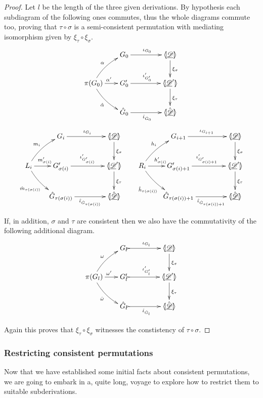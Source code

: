 \begin{proof} Let $l$ be the length of the three given derivations.  By hypothesis each subdiagram of the following ones commutes, thus the whole diagrams commute too, proving that $\tau\circ \sigma$ is a semi-consistent permutation with mediating isomorphism given by $\xi_{\tau} \circ \xi_\sigma$.
		\[\xymatrix@C=18pt{ & G_0 \ar[rr]^{\iota_{G_0}} &&\tpro{D} \ar[d]^{\xi_\sigma} \\ \pi(G_0) \ar@/_.2cm/[dr]_{\hat{\alpha}}\ar@/^.2cm/[ur]^{\alpha} \ar[r]^{\alpha'} &G'_0 \ar[rr]^{\iota'_{G'_0}}  &&\lpro \der{D}'  \rpro \ar[d]^{\xi_{\tau}}\\ &\hat{G}_0  \ar[rr]_{\hat{\iota}_{\hat{G}_0}}&& \lpro \hat{\der{D}}\rpro }\]  
		\[\xymatrix@C=18pt{& G_i \ar[rr]^{\iota_{G_i}} &&\tpro{D} \ar[d]^{\xi_\sigma}&  &  G_{i+1} \ar[rr]^{\iota_{G_{i+1}}} &&\tpro{D} \ar[d]^{\xi_\sigma} \\ L_i \ar@/_.2cm/[dr]_{\hat{m}_{\tau(\sigma(i))}}\ar@/^.2cm/[ur]^{m_i} \ar[r]^{m'_{\sigma(i)}} &G'_{\sigma(i)} \ar[rr]^{\iota'_{G'_{\sigma(i)}}}  &&\lpro \der{D}'  \rpro \ar[d]^{\xi_{\tau}}&R_i \ar@/_.2cm/[dr]_{\hat{h}_{\tau(\sigma(i))}}\ar@/^.2cm/[ur]^{h_i} \ar[r]^{h'_{\sigma(i)}} & G'_{\sigma(i)+1} \ar[rr]^{\iota'_{G'_{\sigma(i)+1}}} && \lpro \der{D}' \rpro \ar[d]^{\xi_{\tau}}\\ &\hat{G}_{\tau(\sigma(i))}  \ar[rr]_-{\hat{\iota}_{\hat{G}_{\tau(\sigma(i))}}}&& \lpro \hat{\der{D}}\rpro  && \hat{G}_{\tau(\sigma(i))+1} \ar[rr]_-{\hat{\iota}_{\hat{G}_{\tau(\sigma(i))+1}}}&& \lpro \hat{\der{D}} \rpro	}\]
	
	If, in addition, $\sigma$ and $\tau$ are consistent then we also have the commutativity of the following additional diagram.
	\[\xymatrix@C=18pt{&   G_{l} \ar@{>->}[rr]^{\iota_{ G_{l}}} &&\tpro{D} \ar[d]^{\xi_\sigma}\\ \pi({ G_{l}})\ar@/_.2cm/[dr]_{\hat{\omega}}\ar@/^.2cm/[ur]^{\omega} \ar[r]^{\omega'} & { G'_{l}} \ar@{>->}[rr]^{\iota'_{{ G'_{l}}}} && \lpro \der{D}' \rpro \ar[d]^{\xi_{\tau}}\\& \hat{G}_l \ar@{>->}[rr]_{\hat{\iota}_{\hat{G}_l}}&& \lpro \hat{\der{D}} \rpro}\]
	
	Again this proves that $\xi_\tau \circ \xi_\sigma$ witnesses the constistency of $\tau\circ \sigma$.
\end{proof}
	

\subsubsection{Restricting  consistent permutations}
Now that we have established some initial facts about consistent permutations, we are going to embark in a, quite long, voyage to explore how to restrict them to suitable subderivations. 


